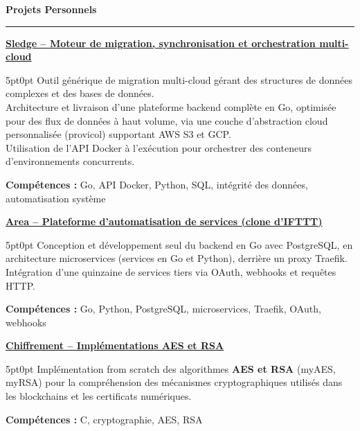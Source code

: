 \documentclass[9pt]{extarticle}
\begin{document}
\par\vspace{5pt}

{\large\bfseries Projets Personnels}
\par\vspace{-8pt}
\rule{\linewidth}{0.4pt}
\par\vspace{5pt}

\underline{\bfseries Sledge -- Moteur de migration, synchronisation et orchestration multi-cloud}
\par
\begin{adjustwidth}{5pt}{0pt}
    Outil générique de migration multi-cloud gérant des structures de données complexes et des bases de données. \\
    Architecture et livraison d'une plateforme backend complète en Go, optimisée pour des flux de données à haut volume, via une couche d'abstraction cloud personnalisée ({\ttfamily provicol}) supportant AWS S3 et GCP. \\
    Utilisation de l'API Docker à l'exécution pour orchestrer des conteneurs d'environnements concurrents.
\end{adjustwidth}
\par
{\bfseries Compétences :} Go, API Docker, Python, SQL, intégrité des données, automatisation système

\par\vspace{8pt}

\underline{\bfseries Area -- Plateforme d'automatisation de services (clone d'IFTTT)}
\par
\begin{adjustwidth}{5pt}{0pt}
    Conception et développement seul du backend en Go avec PostgreSQL, en architecture microservices (services en Go et Python), derrière un proxy Traefik. \\
    Intégration d'une quinzaine de services tiers via OAuth, webhooks et requêtes HTTP.
\end{adjustwidth}
\par
{\bfseries Compétences :} Go, Python, PostgreSQL, microservices, Traefik, OAuth, webhooks

\par\vspace{8pt}

\underline{\bfseries Chiffrement -- Implémentations AES et RSA}
\par
\begin{adjustwidth}{5pt}{0pt}
    Implémentation from scratch des algorithmes {\bfseries AES et RSA} ({\ttfamily myAES}, {\ttfamily myRSA}) pour la compréhension des mécanismes cryptographiques utilisés dans les blockchains et les certificats numériques.
\end{adjustwidth}
\par
{\bfseries Compétences :} C, cryptographie, AES, RSA
\end{document}
